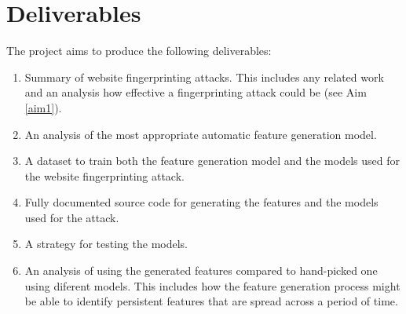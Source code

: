 \documentclass[10pt,a4paper]{article}
\begin{document}
\section{Deliverables}
The project aims to produce the following deliverables:
\begin{enumerate}
  \item Summary of website fingerprinting attacks. This includes any related work and an analysis how effective a fingerprinting attack could be (see Aim \ref{aim1}).
  \item An analysis of the most appropriate automatic feature generation model.
  \item A dataset to train both the feature generation model and the models used for the website fingerprinting attack.
  \item Fully documented source code for generating the features and the models used for the attack.
  \item A strategy for testing the models.
  \item An analysis of using the generated features compared to hand-picked one using diferent models. This includes how the feature generation process might be able to identify persistent features that are spread across a period of time.

\end{enumerate}

\newpage
\end{document}
